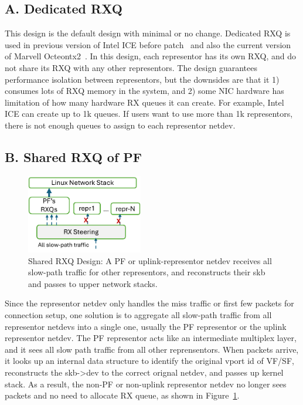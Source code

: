 \documentclass[letterpaper]{article}
\begin{document}
\subsection{A. Dedicated RXQ}
This design is the default design with minimal or no change.
Dedicated RXQ is used in previous version of Intel ICE before patch~\cite{icepatch}
and also the current version of Marvell Octeontx2~\cite{octeontx2}.
In this design, each representor has its own RXQ, and do not share its
RXQ with any other representors. The design guarantees performance isolation
between representors, but the downsides are that it 1) consumes
lots of RXQ memory in the system, and 2) some NIC hardware has limitation of
how many hardware RX queues it can create. For example, Intel ICE can create up to
1k queues. If users want to use more than 1k representors, there is not
enough queues to assign to each representor netdev.

\subsection{B. Shared RXQ of PF}

\begin{figure}[t!]
\includegraphics[width=2in]{design1.pdf}
\centering
\caption{Shared RXQ Design: A PF or uplink-representor netdev receives all
slow-path traffic for other representors, and reconstructs their skb
and passes to upper network stacks.}
\label{fig:sharedrxq}
\end{figure}
Since the representor netdev only handles the miss traffic or first
few packets for connection setup, one solution is to aggregate all
slow-path traffic from all representor netdevs into a single one,
usually the PF representor or the uplink representor netdev.
The PF representor acts like an intermediate multiplex layer, and 
it sees all slow path traffic from all other reprensentors.
When packets arrive, it looks up an internal data structure to identify the
original vport id of VF/SF, reconstructs the skb->dev to the correct
orignal netdev, and passes up kernel stack. As a result, the
non-PF or non-uplink representor netdev no longer sees packets
and no need to allocate RX queue, as shown in Figure~\ref{fig:sharedrxq}.
\end{document}
